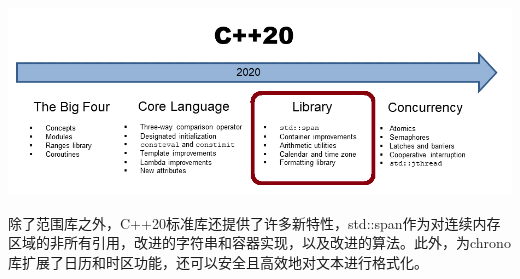 
\begin{center}
\includegraphics[width=1.0\textwidth]{content/3/chapter5/images/1.png}\\
\end{center}

除了范围库之外，C++20标准库还提供了许多新特性，std::span作为对连续内存区域的非所有引用，改进的字符串和容器实现，以及改进的算法。此外，为chrono库扩展了日历和时区功能，还可以安全且高效地对文本进行格式化。